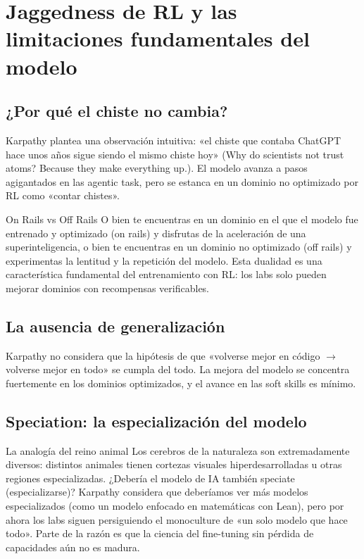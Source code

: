 \section{Jaggedness de RL y las limitaciones fundamentales del modelo}

\subsection{¿Por qué el chiste no cambia?}

Karpathy plantea una observación intuitiva: «el chiste que contaba ChatGPT hace unos años sigue siendo el mismo chiste hoy» (Why do scientists not trust atoms? Because they make everything up.). El modelo avanza a pasos agigantados en las agentic task, pero se estanca en un dominio no optimizado por RL como «contar chistes».

\begin{importantbox}{On Rails vs Off Rails}
O bien te encuentras en un dominio en el que el modelo fue entrenado y optimizado (on rails) y disfrutas de la aceleración de una superinteligencia, o bien te encuentras en un dominio no optimizado (off rails) y experimentas la lentitud y la repetición del modelo. Esta dualidad es una característica fundamental del entrenamiento con RL: los labs solo pueden mejorar dominios con recompensas verificables.
\end{importantbox}

\subsection{La ausencia de generalización}

Karpathy no considera que la hipótesis de que «volverse mejor en código $\rightarrow$ volverse mejor en todo» se cumpla del todo. La mejora del modelo se concentra fuertemente en los dominios optimizados, y el avance en las soft skills es mínimo.

\subsection{Speciation: la especialización del modelo}

\begin{knowledgebox}{La analogía del reino animal}
Los cerebros de la naturaleza son extremadamente diversos: distintos animales tienen cortezas visuales hiperdesarrolladas u otras regiones especializadas. ¿Debería el modelo de IA también speciate (especializarse)? Karpathy considera que deberíamos ver más modelos especializados (como un modelo enfocado en matemáticas con Lean), pero por ahora los labs siguen persiguiendo el monoculture de «un solo modelo que hace todo». Parte de la razón es que la ciencia del fine-tuning sin pérdida de capacidades aún no es madura.
\end{knowledgebox}

